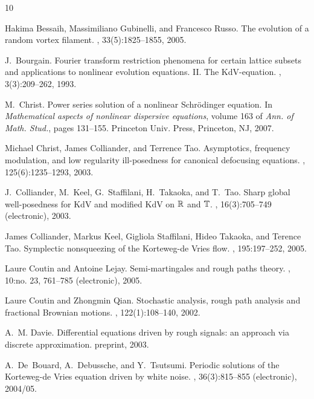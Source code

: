 \documentclass[a4paper,11pt,reqno]{article}
\begin{document}
\begin{thebibliography}{10}

Hakima Bessaih, Massimiliano Gubinelli, and Francesco Russo.
\newblock The evolution of a random vortex filament.
, 33(5):1825--1855, 2005.

J.~Bourgain.
\newblock Fourier transform restriction phenomena for certain lattice subsets
  and applications to nonlinear evolution equations. {II}. {T}he
  {K}d{V}-equation.
, 3(3):209--262, 1993.

M.~Christ.
\newblock Power series solution of a nonlinear {S}chr\"odinger equation.
\newblock In {\em Mathematical aspects of nonlinear dispersive equations},
  volume 163 of {\em Ann. of Math. Stud.}, pages 131--155. Princeton Univ.
  Press, Princeton, NJ, 2007.

Michael Christ, James Colliander, and Terrence Tao.
\newblock Asymptotics, frequency modulation, and low regularity ill-posedness
  for canonical defocusing equations.
, 125(6):1235--1293, 2003.

J.~Colliander, M.~Keel, G.~Staffilani, H.~Takaoka, and T.~Tao.
\newblock Sharp global well-posedness for {K}d{V} and modified {K}d{V} on
  {$\Bbb R$} and {$\Bbb T$}.
, 16(3):705--749 (electronic), 2003.

James Colliander, Markus Keel, Gigliola Staffilani, Hideo Takaoka, and Terence
  Tao.
\newblock Symplectic nonsqueezing of the {K}orteweg-de {V}ries flow.
, 195:197--252, 2005.

Laure Coutin and Antoine Lejay.
\newblock Semi-martingales and rough paths theory.
, 10:no. 23, 761--785 (electronic), 2005.

Laure Coutin and Zhongmin Qian.
\newblock Stochastic analysis, rough path analysis and fractional {B}rownian
  motions.
, 122(1):108--140, 2002.

A.~M. Davie.
\newblock Differential equations driven by rough signals: an approach via
  discrete approximation.
\newblock preprint, 2003.

A.~De~Bouard, A.~Debussche, and Y.~Tsutsumi.
\newblock Periodic solutions of the {K}orteweg-de {V}ries equation driven by
  white noise.
, 36(3):815--855 (electronic), 2004/05.


\end{thebibliography}
\end{document}
